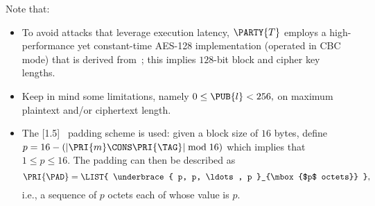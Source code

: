 


%
Note that:

\begin{itemize}
\item To avoid attacks that leverage execution latency, 
      $\PARTY{T}$ 
      employs a high-performance yet constant-time AES-128 implementation 
      (operated in CBC mode) that is derived from~\cite{SCALE:KasSch:09};
      this implies $128$-bit block and cipher key lengths.  
\item Keep in mind some limitations, namely 
      $
      0 \leq \PUB{l} < 256 ,
      $
      on maximum plaintext and/or ciphertext length.
\item The [1.5]~\cite[Section 10.3]{SCALE:RFC:2315} padding scheme 
      is used: given a block size of $16$ bytes, define
      $
      p = 16 - ( | \PRI{m} \CONS \PRI{\TAG} | \bmod 16 ) 
      $
      which implies that
      $
      1 \leq p \leq 16 .
      $
      The padding can then be described as
      \[
      \PRI{\PAD} = \LIST{ \underbrace{ p, p, \ldots, p }_{\mbox{$p$ octets}} } ,
      \]
      i.e., a sequence of $p$ octets each of whose value is $p$.
\end{itemize}


